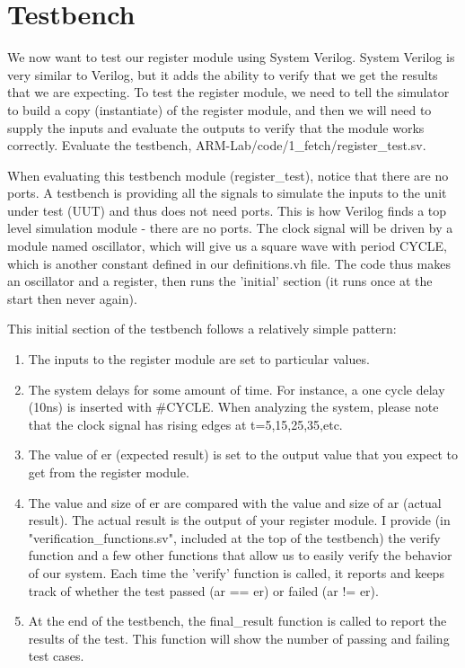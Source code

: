 \section{Testbench}

We now want to test our register module using System Verilog.  System Verilog is very similar to Verilog, but it adds the ability to verify that we get the results that we are expecting.  To test the register module, we need to tell the simulator to build a copy (instantiate) of the register module, and then we will need to supply the inputs and evaluate the outputs to verify that the module works correctly.  Evaluate the testbench, ARM-Lab/code/1\_fetch/register\_test.sv.

When evaluating this testbench module (register\_test), notice that there are no ports.  A testbench is providing all the signals to simulate the inputs to the unit under test (UUT) and thus does not need ports.  This is how Verilog finds a top level simulation module - there are no ports.  The clock signal will be driven by a module named oscillator, which will give us a square wave with period CYCLE, which is another constant defined in our definitions.vh file.  The code thus makes an oscillator and a register, then runs the 'initial' section (it runs once at the start then never again).

This initial section of the testbench follows a relatively simple pattern:
\begin{enumerate}
	\item The inputs to the register module are set to particular values.
	\item The system delays for some amount of time.  For instance, a one cycle delay (10ns) is inserted with \#CYCLE.  When analyzing the system, please note that the clock signal has rising edges at t=5,15,25,35,etc.
	\item The value of er (expected result) is set to the output value that you expect to get from the register module.
	\item The value and size of er are compared with the value and size of ar (actual result).  The actual result is the output of your register module.  I provide (in "verification\_functions.sv", included at the top of the testbench) the verify function and a few other functions that allow us to easily verify the behavior of our system.  Each time the 'verify' function is called, it reports and keeps track of whether the test passed (ar == er) or failed (ar != er).
	\item At the end of the testbench, the final\_result function is called to report the results of the test.  This function will show the number of passing and failing test cases.
\end{enumerate}  


